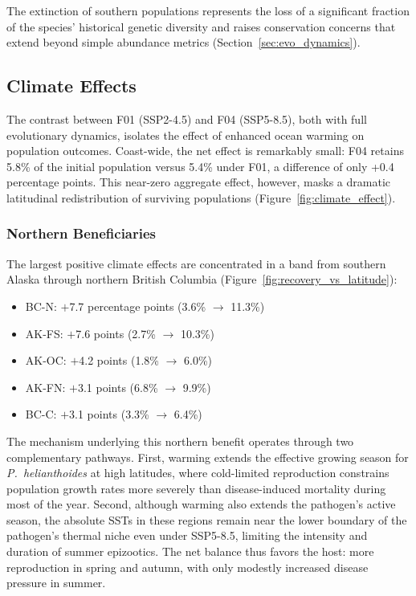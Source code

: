 The extinction of southern populations represents the loss of a
significant fraction of the species' historical genetic diversity and
raises conservation concerns that extend beyond simple abundance
metrics (Section~\ref{sec:evo_dynamics}).

\subsection{Climate Effects}
\label{sec:climate_effects}

The contrast between F01 (SSP2-4.5) and F04 (SSP5-8.5), both with
full evolutionary dynamics, isolates the effect of enhanced ocean
warming on population outcomes.  Coast-wide, the net effect is
remarkably small: F04 retains 5.8\% of the initial population versus
5.4\% under F01, a difference of only +0.4 percentage points.  This
near-zero aggregate effect, however, masks a dramatic latitudinal
redistribution of surviving populations
(Figure~\ref{fig:climate_effect}).

\subsubsection{Northern Beneficiaries}

The largest positive climate effects are concentrated in a band from
southern Alaska through northern British Columbia
(Figure~\ref{fig:recovery_vs_latitude}):

\begin{itemize}
  \item BC-N: $+$7.7 percentage points (3.6\% $\rightarrow$ 11.3\%)
  \item AK-FS: $+$7.6 points (2.7\% $\rightarrow$ 10.3\%)
  \item AK-OC: $+$4.2 points (1.8\% $\rightarrow$ 6.0\%)
  \item AK-FN: $+$3.1 points (6.8\% $\rightarrow$ 9.9\%)
  \item BC-C: $+$3.1 points (3.3\% $\rightarrow$ 6.4\%)
\end{itemize}

\noindent
The mechanism underlying this northern benefit operates through two
complementary pathways.  First, warming extends the effective growing
season for \textit{P.~helianthoides} at high latitudes, where
cold-limited reproduction constrains population growth rates more
severely than disease-induced mortality during most of the year.
Second, although warming also extends the pathogen's active season,
the absolute SSTs in these regions remain near the lower boundary of
the pathogen's thermal niche even under SSP5-8.5, limiting the
intensity and duration of summer epizootics.  The net balance thus
favors the host: more reproduction in spring and autumn, with only
modestly increased disease pressure in summer.


